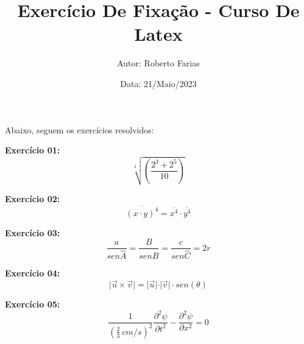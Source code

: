 \documentclass[a4paper,12pt]{article}
\title{\textbf{Exercício De Fixação - Curso De Latex}}
\author{Autor: Roberto Farias}
\date{Data: 21/Maio/2023}
\begin{document}
\maketitle %

Abaixo, seguem os exercícios resolvidos:

\vspace{1cm}

\textbf{Exercício 01:}
\begin{equation}
	\sqrt[3]{\left(\frac{2^3+2^5}{10}\right)}
\end{equation}

\textbf{Exercício 02:}
\begin{equation}
	\overline{(x \cdot y)^4}=\overline{x^4} \cdot \overline{y^4}
\end{equation}

\textbf{Exercício 03:}
\begin{equation}
	\frac{a}{sen \widehat{A}}=\frac{B}{sen \widehat{B}}=\frac{c}{sen \widehat{C}}=2r
\end{equation}

\textbf{Exercício 04:}
\begin{equation}
	\vert \vec{u} \times \vec{v} \vert = \vert \vec{u} \vert \cdot \vert \vec{v} \vert \cdot sen (\theta)
\end{equation}

\textbf{Exercício 05:}
\begin{equation}
	\frac{1}{\left(\frac{2}{3} \: cm/s \right)^2} \frac{\partial^2 \psi}{\partial t^2}-\frac{\partial^2 \psi}{\partial x^2}=0
\end{equation}
\end{document}
